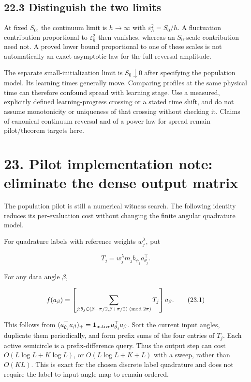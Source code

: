 \documentclass[
  10pt,
]{article}
\begin{document}
\subsection{22.3 Distinguish the two
limits}\label{distinguish-the-two-limits}

At fixed \(S_0\), the continuum limit is \(h\to\infty\) with
\(\varepsilon_h^2=S_0/h\). A fluctuation contribution proportional to
\(\varepsilon_h^2\) then vanishes, whereas an \(S_0\)-scale contribution
need not. A proved lower bound proportional to one of these scales is
not automatically an exact asymptotic law for the full reversal
amplitude.

The separate small-initialization limit is \(S_0\downarrow0\) after
specifying the population model. Its learning times generally move.
Comparing profiles at the same physical time can therefore confound
spread with learning stage. Use a measured, explicitly defined
learning-progress crossing or a stated time shift, and do not assume
monotonicity or uniqueness of that crossing without checking it. Claims
of canonical continuum reversal and of a power law for spread remain
pilot/theorem targets here.

\section{23. Pilot implementation note: eliminate the dense output
matrix}\label{pilot-implementation-note-eliminate-the-dense-output-matrix}

The population pilot is still a numerical witness search. The following
identity reduces its per-evaluation cost without changing the finite
angular quadrature model.

For quadrature labels with reference weights \(w_j^\lambda\), put

\[
 T_j=w_j^\lambda m_j b_{\psi_j}a_{\theta_j}^\top.
\]

For any data angle \(\beta\),

\[
 f(a_\beta)=
 \left[\sum_{j:\theta_j\in(\beta-\pi/2,\beta+\pi/2)\;({\rm mod}\;2\pi)}T_j\right]a_\beta.
 \tag{23.1}
\]

This follows from
\((a_{\theta_j}^\top a_\beta)_+=\mathbf1_{\rm active}a_{\theta_j}^\top a_\beta\).
Sort the current input angles, duplicate them periodically, and form
prefix sums of the four entries of \(T_j\). Each active semicircle is a
prefix-difference query. Thus the output step can cost
\(O(L\log L+K\log L)\), or \(O(L\log L+K+L)\) with a sweep, rather than
\(O(KL)\). This is exact for the chosen discrete label quadrature and
does not require the label-to-input-angle map to remain ordered.
\end{document}
